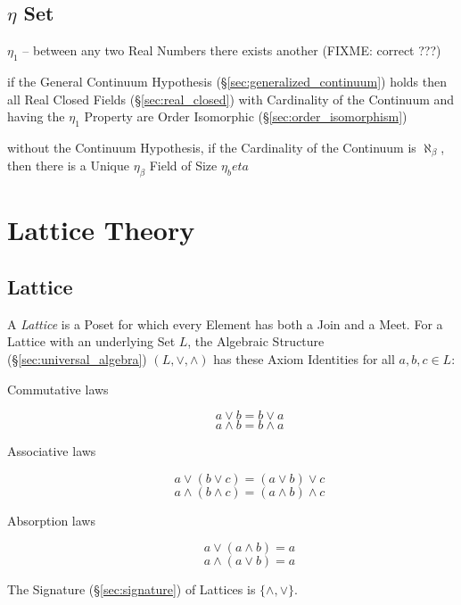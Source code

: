 \subsection{$\eta$ Set}\label{sec:eta_set}

$\eta_1$ -- between any two Real Numbers there exists another (FIXME: correct
???)

if the General Continuum Hypothesis (\S\ref{sec:generalized_continuum}) holds
then all Real Closed Fields (\S\ref{sec:real_closed}) with Cardinality of the
Continuum and having the $\eta_1$ Property are Order Isomorphic
(\S\ref{sec:order_isomorphism})

without the Continuum Hypothesis, if the Cardinality of the Continuum is
$\aleph_\beta$, then there is a Unique $\eta_\beta$ Field of Size $\eta_beta$



\section{Lattice Theory}\label{sec:lattice_theory}

\subsection{Lattice}\label{sec:lattice}

A \emph{Lattice} is a Poset for which every Element has both a Join
and a Meet. For a Lattice with an underlying Set $L$, the Algebraic
Structure (\S\ref{sec:universal_algebra}) $(L, \vee, \wedge)$ has
these Axiom Identities for all $a,b,c \in L$:
\begin{description}
\item[Commutative laws]
\[
    a \vee b = b \vee a
\] \[
    a \wedge b = b \wedge a
\]
\item[Associative laws]
\[
    a \vee (b \vee c) = (a \vee b) \vee c
\] \[
    a \wedge (b \wedge c) = (a \wedge b) \wedge c
\]
\item[Absorption laws]
\[
    a \vee (a \wedge b) = a
\] \[
    a \wedge (a \vee b) = a
\]
\end{description}
The Signature (\S\ref{sec:signature}) of Lattices is
$\{\wedge, \vee\}$.



